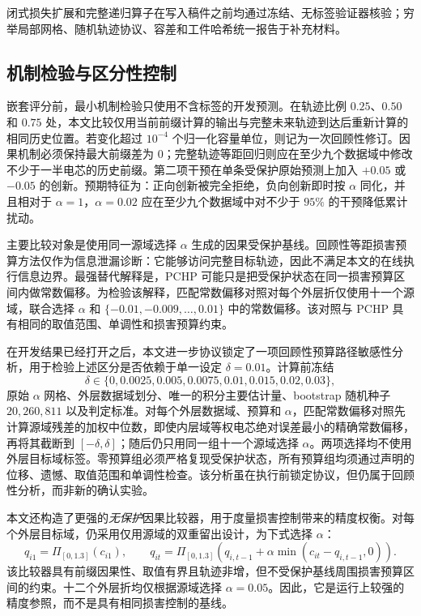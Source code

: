 \documentclass[UTF8,11pt]{ctexart}
\begin{document}
闭式损失扩展和完整递归算子在写入稿件之前均通过冻结、无标签验证器核验；穷举局部网格、随机轨迹协议、容差和工件哈希统一报告于补充材料。

\subsection{机制检验与区分性控制}

嵌套评分前，最小机制检验只使用不含标签的开发预测。在轨迹比例 $0.25$、$0.50$ 和 $0.75$ 处，本文比较仅用当前前缀计算的输出与完整未来轨迹到达后重新计算的相同历史位置。若变化超过 $10^{-4}$ 个归一化容量单位，则记为一次回顾性修订。因果机制必须保持最大前缀差为 $0$；完整轨迹等距回归则应在至少九个数据域中修改不少于一半电芯的历史前缀。第二项干预在单条受保护原始预测上加入 $+0.05$ 或 $-0.05$ 的创新。预期特征为：正向创新被完全拒绝，负向创新即时按 $\alpha$ 同化，并且相对于 $\alpha=1$，$\alpha=0.02$ 应在至少九个数据域中对不少于 $95\%$ 的干预降低累计扰动。

主要比较对象是使用同一源域选择 $\alpha$ 生成的因果受保护基线。回顾性等距损害预算方法仅作为信息泄漏诊断：它能够访问完整目标轨迹，因此不满足本文的在线执行信息边界。最强替代解释是，PCHP 可能只是把受保护状态在同一损害预算区间内做常数偏移。为检验该解释，匹配常数偏移对照对每个外层折仅使用十一个源域，联合选择 $\alpha$ 和 $\{-0.01,-0.009,\ldots,0.01\}$ 中的常数偏移。该对照与 PCHP 具有相同的取值范围、单调性和损害预算约束。

在开发结果已经打开之后，本文进一步协议锁定了一项回顾性预算路径敏感性分析，用于检验上述区分是否依赖于单一设定 $\delta=0.01$。计算前冻结
\[
\delta\in\{0,0.0025,0.005,0.0075,0.01,0.015,0.02,0.03\},
\]
原始 $\alpha$ 网格、外层数据域划分、唯一的积分主要估计量、bootstrap 随机种子 $20{,}260{,}811$ 以及判定标准。对每个外层数据域、预算和 $\alpha$，匹配常数偏移对照先计算源域残差的加权中位数，即使内层域等权电芯绝对误差最小的精确常数偏移，再将其截断到 $[-\delta,\delta]$；随后仍只用同一组十一个源域选择 $\alpha$。两项选择均不使用外层目标域标签。零预算组必须严格复现受保护状态，所有预算组均须通过声明的位移、遗憾、取值范围和单调性检查。该分析虽在执行前锁定协议，但仍属于回顾性分析，而非新的确认实验。

本文还构造了更强的\emph{无保护}因果比较器，用于度量损害控制带来的精度权衡。对每个外层目标域，仍采用仅用源域的双重留出设计，为下式选择 $\alpha$：
\[
q_{i1}=\Pi_{[0,1.3]}(c_{i1}),\qquad
q_{it}=\Pi_{[0,1.3]}\!\left(q_{i,t-1}+\alpha\min(c_{it}-q_{i,t-1},0)\right).
\]
该比较器具有前缀因果性、取值有界且轨迹非增，但不受保护基线周围损害预算区间的约束。十二个外层折均仅根据源域选择 $\alpha=0.05$。因此，它是运行上较强的精度参照，而不是具有相同损害控制的基线。
\end{document}
